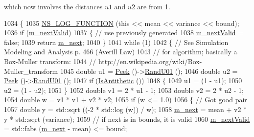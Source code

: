 which now involves the distances $u1$ and $u2$ are from 1. 
\begin{DoxyCode}
1034 \{
1035   \hyperlink{log-macros-disabled_8h_a90b90d5bad1f39cb1b64923ea94c0761}{NS\_LOG\_FUNCTION} (\textcolor{keyword}{this} << mean << variance << bound);
1036   \textcolor{keywordflow}{if} (\hyperlink{classns3_1_1GammaRandomVariable_a9824f728f2f97299387ca3990464de85}{m\_nextValid})
1037     \{ \textcolor{comment}{// use previously generated}
1038       \hyperlink{classns3_1_1GammaRandomVariable_a9824f728f2f97299387ca3990464de85}{m\_nextValid} = \textcolor{keyword}{false};
1039       \textcolor{keywordflow}{return} \hyperlink{classns3_1_1GammaRandomVariable_a192cfe661857c7e669e19a7984fd9491}{m\_next};
1040     \}
1041   \textcolor{keywordflow}{while} (1)
1042     \{ \textcolor{comment}{// See Simulation Modeling and Analysis p. 466 (Averill Law)}
1043       \textcolor{comment}{// for algorithm; basically a Box-Muller transform:}
1044       \textcolor{comment}{// http://en.wikipedia.org/wiki/Box-Muller\_transform}
1045       \textcolor{keywordtype}{double} u1 = \hyperlink{classns3_1_1RandomVariableStream_ac5aa8d691c061bcc88a909dc9b479222}{Peek} ()->\hyperlink{classns3_1_1RngStream_a46be36426b8bc712e9de468b63558c22}{RandU01} ();
1046       \textcolor{keywordtype}{double} u2 = \hyperlink{classns3_1_1RandomVariableStream_ac5aa8d691c061bcc88a909dc9b479222}{Peek} ()->\hyperlink{classns3_1_1RngStream_a46be36426b8bc712e9de468b63558c22}{RandU01} ();
1047       \textcolor{keywordflow}{if} (\hyperlink{classns3_1_1RandomVariableStream_a7bf5175d624b14bd023f8c4f78bc5fd7}{IsAntithetic} ())
1048         \{
1049           u1 = (1 - u1);
1050           u2 = (1 - u2);
1051         \}
1052       \textcolor{keywordtype}{double} v1 = 2 * u1 - 1;
1053       \textcolor{keywordtype}{double} v2 = 2 * u2 - 1;
1054       \textcolor{keywordtype}{double} \hyperlink{lte_2model_2fading-traces_2fading__trace__generator_8m_afd61ec66f9d7b807eece6eb12c781844}{w} = v1 * v1 + v2 * v2;
1055       \textcolor{keywordflow}{if} (w <= 1.0)
1056         \{ \textcolor{comment}{// Got good pair}
1057           \textcolor{keywordtype}{double} y = std::sqrt ((-2 * std::log (w)) / w);
1058           \hyperlink{classns3_1_1GammaRandomVariable_a192cfe661857c7e669e19a7984fd9491}{m\_next} = mean + v2 * y * std::sqrt (variance);
1059           \textcolor{comment}{// if next is in bounds, it is valid}
1060           \hyperlink{classns3_1_1GammaRandomVariable_a9824f728f2f97299387ca3990464de85}{m\_nextValid} = std::fabs (\hyperlink{classns3_1_1GammaRandomVariable_a192cfe661857c7e669e19a7984fd9491}{m\_next} - mean) <= bound;

\end{DoxyCode}
